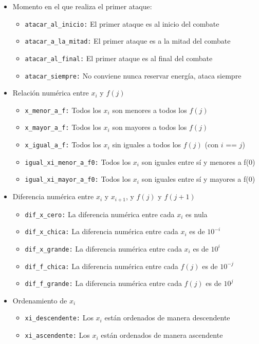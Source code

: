 \documentclass{article}
\begin{document}
\begin{itemize}
    \item Momento en el que realiza el primer ataque:
    \begin{itemize}
        \item \texttt{atacar\_al\_inicio:} El primer ataque es al inicio del combate
        \item \texttt{atacar\_a\_la\_mitad:} El primer ataque es a la mitad del combate
        \item \texttt{atacar\_al\_final:} El primer ataque es al final del combate
        \item \texttt{atacar\_siempre:} No conviene nunca reservar energía, ataca siempre
    \end{itemize}
    \item Relación numérica entre $x_i$ y $f(j)$
        \begin{itemize}
        \item \texttt{x\_menor\_a\_f:} Todos los $x_i$ son menores a todos los $f(j)$
        \item \texttt{x\_mayor\_a\_f:} Todos los $x_i$ son mayores a todos los $f(j)$
        \item \texttt{x\_igual\_a\_f:} Todos los $x_i$ sin iguales a todos los $f(j)$ (con $i$ == $j$)
        \item \texttt{igual\_xi\_menor\_a\_f0:} Todos los $x_i$ son iguales entre sí y menores a f(0)
        \item \texttt{igual\_xi\_mayor\_a\_f0:} Todos los $x_i$ son iguales entre sí y mayores a f(0)
    \end{itemize}
    \item Diferencia numérica entre $x_i$ y $x_{i+1}$, y $f(j)$ y $f(j+1)$
    \begin{itemize}
        \item \texttt{dif\_x\_cero:} La diferencia numérica entre cada $x_i$ es nula
        \item \texttt{dif\_x\_chica:} La diferencia numérica entre cada $x_i$ es de $10^{-i}$
        \item \texttt{dif\_x\_grande:} La diferencia numérica entre cada $x_i$ es de $10^i$
        \item \texttt{dif\_f\_chica:} La diferencia numérica entre cada $f(j)$ es de $10^{-j}$
        \item \texttt{dif\_f\_grande:} La diferencia numérica entre cada $f(j)$ es de $10^j$
    \end{itemize}
    \item Ordenamiento de $x_i$
    \begin{itemize}
        \item \texttt{xi\_descendente:} Los $x_i$ están ordenados de manera descendente
        \item \texttt{xi\_ascendente:} Los $x_i$ están ordenados de manera ascendente
        

\end{itemize}
\end{itemize}
\end{document}
